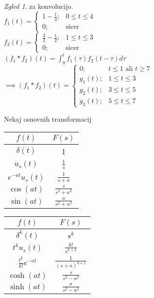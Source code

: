 \documentclass[a4paper, 12pt]{book}
\theoremstyle{definition}
\theoremstyle{remark}
\newtheorem*{exmp}{Zgled}
\begin{document}
\begin{exmp} za konvolucijo. \\
    $f_1(t) = \begin{cases}
        1 - \frac{t}{4}; & 0 \leq t \leq 4 \\
        0; & \text{sicer}
    \end{cases}$ \\
    $f_2(t) = \begin{cases}
        \frac{3}{2} - \frac{t}{2}; & 1 \leq t \leq 3 \\
        0; & \text{sicer}
    \end{cases}$ \\
    $(f_1 * f_2)(t) = \int_0^t f_1(\tau) f_2(t-\tau) d\tau$ \\
    $\implies (f_1 * f_2)(t) = \begin{cases}
        0; & t \leq 1 \text{ ali } t \geq 7 \\
        g_1(t); & 1 \leq t \leq 3 \\
        g_2(t); & 3 \leq t \leq 5 \\
        g_3(t); & 5 \leq t \leq 7
    \end{cases}$
\end{exmp}
Nekaj osnovnih transformacij
\begin{center}
   \begin{tabular}{c | c}
        $f(t)$ & $F(s)$ \\
        \hline
        $\delta(t)$ & 1 \\
        $u_s(t)$ & $\frac{1}{s}$ \\
        $e^{-at} u_s(t)$ & $\frac{1}{s + a}$ \\
        $\cos(at)$ & $\frac{s}{s^2 + a^2}$ \\
        $\sin(at)$ & $\frac{a}{s^2 + a^2}$
   \end{tabular}
\end{center}

\begin{center}
   \begin{tabular}{c | c}
        $f(t)$ & $F(s)$ \\
        \hline
        $\delta^k(t)$ & $s^k$ \\
        $t^k u_s(t)$ & $\frac{k!}{s^{k+1}}$ \\
        $\frac{t^k}{k!} e^{-at}$ & $\frac{1}{(s+a)^{k+1}}$ \\
        $\cosh(at)$ & $\frac{s}{s^2 - a^2}$ \\
        $\sinh(at)$ & $\frac{a}{s^2 - a^2}$
   \end{tabular}
\end{center}
\end{document}
